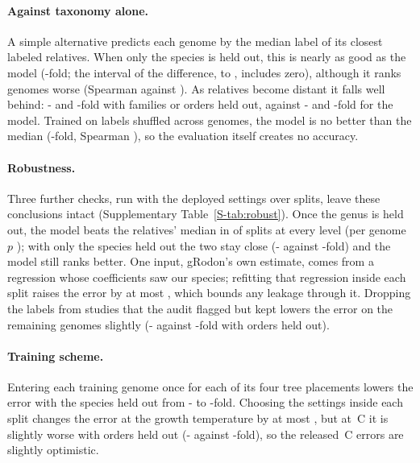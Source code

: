 \paragraph{Against taxonomy alone.} A simple alternative predicts each genome by the median label of its closest labeled
relatives. When only the species is held out, this is nearly as good as the model (\BaseRelErrSameGenus-fold; the interval of
the difference, \CIDiffLoSameGenus to \CIDiffHiSameGenus, includes zero), although it ranks genomes worse (Spearman
\BaseRelRhoSameGenus against \RhoSameGenus). As relatives become distant it falls well behind: \BaseRelErrNewFamily- and
\BaseRelErrNewOrder-fold with families or orders held out, against \ErrNewFamily- and \ErrNewOrder-fold for the model.
Trained on labels shuffled across genomes, the model is no better than the median (\ShuffleErrSpecies-fold, Spearman
\ShuffleRhoSpecies), so the evaluation itself creates no accuracy.

\paragraph{Robustness.} Three further checks, run with the deployed settings over \TenNSeeds splits, leave these conclusions
intact (Supplementary Table~\ref{S-tab:robust}). Once the genus is held out, the model beats the relatives' median in
\TenModelWinsDeepMin of \TenNSeeds splits at every level (per genome $p$ \TenPGenomeDeepMax); with only the species held out
the two stay close (\TenModelErrSpecies- against \TenBaseErrSpecies-fold) and the model still ranks better. One input,
gRodon's own estimate, comes from a regression whose coefficients saw our species; refitting that regression inside each
split raises the error by at most \RefitMaxDiff, which bounds any leakage through it. Dropping the \FlagNLabels labels from
studies that the audit flagged but kept lowers the error on the remaining genomes slightly (\FlagErrOrder- against
\FlagFullErrOrder-fold with orders held out).

\paragraph{Training scheme.} Entering each training genome once for each of its four tree placements lowers the error with
the species held out from \FixedErrSameGenus- to \CoarseErrSameGenus-fold. Choosing the settings inside each split changes
the error at the growth temperature by at most \SelectMaxDiff, but at \TRefC\,\textdegree C it is slightly worse with orders held out
(\ErrRefNewOrder- against \FixedErrRefNewOrder-fold), so the released \TRefC\,\textdegree C errors are slightly optimistic.

